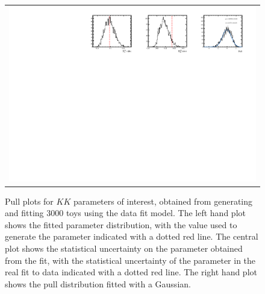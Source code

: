 \begin{figure}
\begin{tabular}{c}
\includegraphics[width=\textwidth]{ANA_resources/Plots/Data_fit/FitterBias//CombinedRuns//R_ds_pipi.pdf} \\
  \end{tabular}
  \caption{Pull plots for $KK$ parameters of interest, obtained from generating and fitting 3000 toys using the data fit model. The left hand plot shows the fitted parameter distribution, with the value used to generate the parameter indicated with a dotted red line. The central plot shows the statistical uncertainty on the parameter obtained from the fit, with the statistical uncertainty of the parameter in the real fit to data indicated with a dotted red line. The right hand plot shows the pull distribution fitted with a Gaussian.}
\label{fig:pipi/CombinedRuns/_pulls}
\end{figure}

